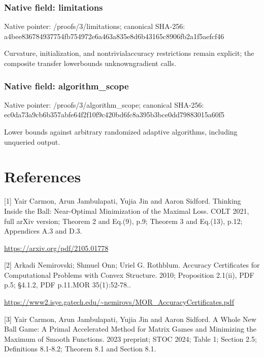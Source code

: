 \documentclass[10pt,a4paper]{article}
\begin{document}
\subsubsection{Native field: limitations}


Native pointer: /proofs/3/limitations; canonical SHA-256: a4bee836784937754fb75497\allowbreak{}2e6a463a835e8d6b43165c89\allowbreak{}06fb2a1f5aefcf46


Curvature, initialization, and nontrivialaccuracy restrictions remain explicit; the composite transfer lowerbounds unknowngradient calls.


\subsubsection{Native field: algorithm\_scope}


Native pointer: /proofs/3/algorithm\_scope; canonical SHA-256: ec0da73a9cb6b357abfe64f2\allowbreak{}f10f9c420bd6fc8a395b3bce\allowbreak{}0dd79883015a60f5


Lower bounds against arbitrary randomized adaptive algorithms, including unqueried output.


\section{References}


[1] Yair Carmon, Arun Jambulapati, Yujia Jin and Aaron Sidford. Thinking Inside the Ball: Near-Optimal Minimization of the Maximal Loss. COLT 2021, full arXiv version; Theorem 2 and Eq.(9), p.9; Theorem 3 and Eq.(13), p.12; Appendices A.3 and D.3.



\url{https://arxiv.org/pdf/2105.01778}



[2] Arkadi Nemirovski; Shmuel Onn; Uriel G. Rothblum. Accuracy Certificates for Computational Problems with Convex Structure. 2010; Proposition 2.1(ii), PDF p.5; §4.1.2, PDF p.11.MOR 35(1):52-78..



\url{https://www2.isye.gatech.edu/~nemirovs/MOR_AccuracyCertificates.pdf}



[3] Yair Carmon, Arun Jambulapati, Yujia Jin and Aaron Sidford. A Whole New Ball Game: A Primal Accelerated Method for Matrix Games and Minimizing the Maximum of Smooth Functions. 2023 preprint; STOC 2024; Table 1; Section 2.5; Definitions 8.1-8.2; Theorem 8.1 and Section 8.1.
\end{document}
